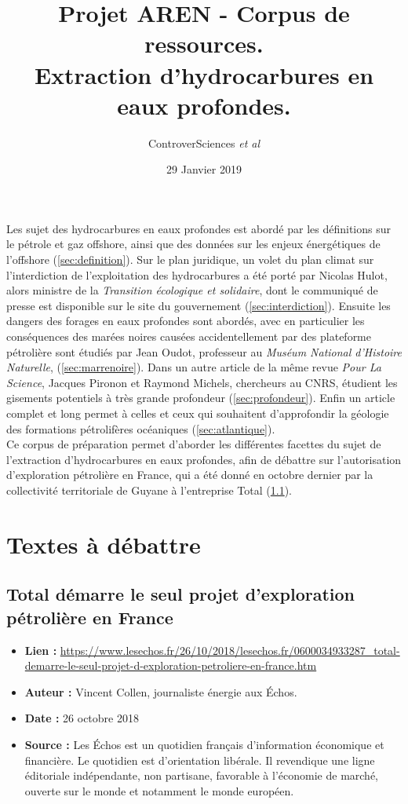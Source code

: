 \documentclass[8pt]{article}
\author{ControverSciences\textit{ et al} }
\title{Projet AREN - Corpus de ressources. \\  Extraction d'hydrocarbures en eaux profondes.}
\date{29 Janvier 2019}
\begin{document}
\maketitle

Les sujet des hydrocarbures en eaux profondes est abordé par les définitions sur le pétrole et gaz offshore, ainsi que des données sur les enjeux énergétiques de l'offshore (\ref{sec:definition}). Sur le plan juridique, un volet du plan climat sur l'interdiction de l'exploitation des hydrocarbures a été porté par Nicolas Hulot, alors ministre de la \textit{Transition écologique et solidaire}, dont le communiqué de presse est disponible sur le site du gouvernement (\ref{sec:interdiction}). Ensuite les dangers des forages en eaux profondes sont abordés, avec en particulier les conséquences des marées noires causées accidentellement par des plateforme pétrolière sont étudiés par Jean Oudot, professeur au \textit{Muséum National d’Histoire Naturelle}, (\ref{sec:marrenoire}). Dans un autre article de la même revue \textit{Pour La Science}, Jacques Pironon et Raymond Michels, chercheurs au CNRS, étudient les gisements potentiels à très grande profondeur (\ref{sec:profondeur}). Enfin un article complet et long permet à celles et ceux qui souhaitent d'approfondir la géologie des formations pétrolifères océaniques (\ref{sec:atlantique}).\\

Ce corpus de préparation permet d'aborder les différentes facettes du sujet de l'extraction d'hydrocarbures en eaux profondes, afin de débattre sur l'autorisation d’exploration pétrolière en France, qui a été donné en octobre dernier par la collectivité territoriale de Guyane à l'entreprise Total (\ref{sec:total_echos}).


\tableofcontents

\newpage
\section{Textes à débattre}

\subsection{Total démarre le seul projet d'exploration pétrolière en France }
\label{sec:total_echos}

\begin{itemize}
	\item \textbf{Lien : }  \url{https://www.lesechos.fr/26/10/2018/lesechos.fr/0600034933287_total-demarre-le-seul-projet-d-exploration-petroliere-en-france.htm} 
	\item \textbf{Auteur : }  Vincent Collen, journaliste énergie aux Échos.
	\item \textbf{Date : } 26 octobre 2018
	\item \textbf{Source : } Les Échos est un quotidien français d’information économique et financière. Le quotidien est d'orientation libérale. Il revendique une ligne éditoriale indépendante, non partisane, favorable à l'économie de marché, ouverte sur le monde et notamment le monde européen. 
\end{itemize}
\end{document}
